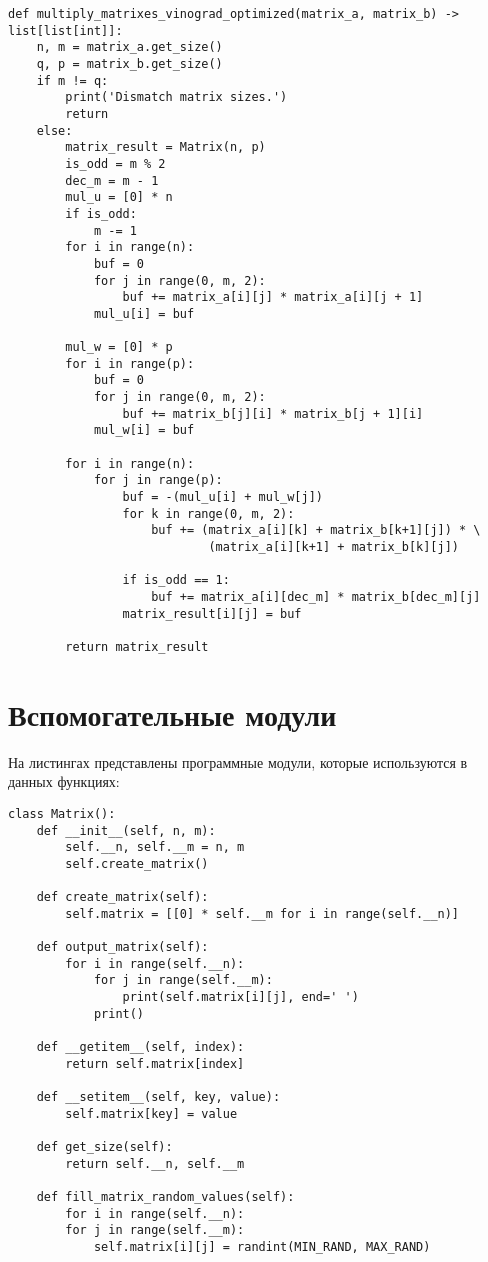 \begin{lstlisting}[label=optim_vinograd, caption=Программный код оптимизированного алгоритма умножения матриц по Винограду.]
def multiply_matrixes_vinograd_optimized(matrix_a, matrix_b) -> list[list[int]]:
	n, m = matrix_a.get_size()
	q, p = matrix_b.get_size()
	if m != q:
		print('Dismatch matrix sizes.')
		return
	else:
		matrix_result = Matrix(n, p)
		is_odd = m % 2
		dec_m = m - 1
		mul_u = [0] * n
		if is_odd:
			m -= 1
		for i in range(n):
			buf = 0
			for j in range(0, m, 2):
				buf += matrix_a[i][j] * matrix_a[i][j + 1]
			mul_u[i] = buf
		
		mul_w = [0] * p
		for i in range(p):
			buf = 0
			for j in range(0, m, 2):
				buf += matrix_b[j][i] * matrix_b[j + 1][i]
			mul_w[i] = buf
		
		for i in range(n):
			for j in range(p):
				buf = -(mul_u[i] + mul_w[j])
				for k in range(0, m, 2):
					buf += (matrix_a[i][k] + matrix_b[k+1][j]) * \
							(matrix_a[i][k+1] + matrix_b[k][j])
		
				if is_odd == 1:
					buf += matrix_a[i][dec_m] * matrix_b[dec_m][j]
				matrix_result[i][j] = buf
		
		return matrix_result
\end{lstlisting}

\section{Вспомогательные модули}
На листингах представлены программные модули, которые используются в данных функциях:
\begin{lstlisting}[label=lst:struct_matrix,caption=Программный код класса по работе с матрицами.]
class Matrix():
	def __init__(self, n, m):
		self.__n, self.__m = n, m
		self.create_matrix()
	
	def create_matrix(self):
		self.matrix = [[0] * self.__m for i in range(self.__n)]
	
	def output_matrix(self):
		for i in range(self.__n):
			for j in range(self.__m):
				print(self.matrix[i][j], end=' ')
			print()
	
	def __getitem__(self, index):
		return self.matrix[index]
	
	def __setitem__(self, key, value):
		self.matrix[key] = value
	
	def get_size(self):
		return self.__n, self.__m
	
	def fill_matrix_random_values(self):
		for i in range(self.__n):
		for j in range(self.__m):
			self.matrix[i][j] = randint(MIN_RAND, MAX_RAND)
\end{lstlisting}

